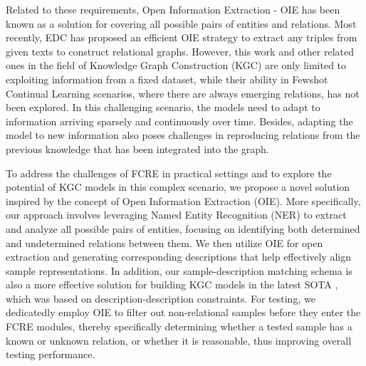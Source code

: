Related to these requirements, Open Information Extraction - OIE \citep{liu2022open, zhou2022survey,li2023evaluating} has been known as a solution for covering all possible pairs of entities and relations. Most recently, EDC \citep{zhang-soh-2024-extract} has proposed an efficient OIE strategy to extract any triples from given texts to construct relational graphs. 
However, this work and other related ones in the field of Knowledge Graph Construction (KGC) are only limited to exploiting information from a fixed dataset, while their ability in Fewshot Continual Learning scenarios, where there are always emerging relations, has not been explored. In this challenging scenario, the models need to adapt to information arriving sparsely and continuously over time. Besides, adapting the model to new information also poses challenges in reproducing relations from the previous knowledge that has been integrated into the graph.

To address the challenges of FCRE in practical settings and to explore the potential of KGC models in this complex scenario, we propose a novel solution inspired by the concept of Open Information Extraction (OIE). More specifically, our approach involves leveraging Named Entity Recognition (NER) \citep{zaratiana2023glinergeneralistmodelnamed} to extract and analyze all possible pairs of entities, focusing on identifying both determined and undetermined relations between them. We then utilize OIE for open extraction and generating corresponding descriptions that help effectively align sample representations. In addition, our sample-description matching schema is also a more effective solution for building KGC models in the latest SOTA \citep{zhang-soh-2024-extract}, which was based on description-description constraints. For testing, we dedicatedly employ OIE to filter out non-relational samples before they enter the FCRE modules, thereby specifically determining whether a tested sample has a known or unknown relation, or whether it is reasonable, thus improving overall testing performance. 

